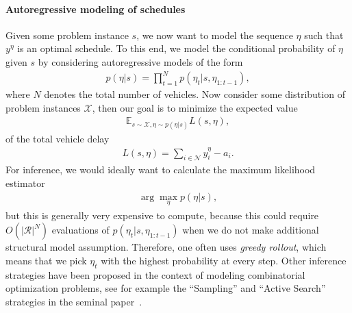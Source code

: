 \documentclass[a4paper]{article}
\theoremstyle{definition}
\theoremstyle{plain}
\begin{document}
\paragraph{Autoregressive modeling of schedules}
Given some problem instance $s$, we now want to model the sequence $\eta$ such
that $y^{\eta}$ is an optimal schedule. To this end, we model the conditional
probability of $\eta$ given $s$ by considering autoregressive models of the form
\begin{align}
  \label{eq:autoregressive}
  p(\eta | s) = \prod_{t=1}^{N} p(\eta_{t} | s, \eta_{1:t-1}) ,
\end{align}
where $N$ denotes the total number of vehicles. Now consider some distribution
of problem instances $\mathcal{X}$, then our goal is to minimize the expected
value
\begin{align*}
  \mathbb{E}_{s \sim \mathcal{X}, \eta \sim p(\eta | s)} L(s, \eta) ,
\end{align*}
of the total vehicle delay
\begin{align*}
  L(s, \eta) = \sum_{i \in \mathcal{N}} y^{\eta}_{i} - a_{i} .
\end{align*}
%
For inference, we would ideally want to calculate the maximum likelihood
estimator
\begin{align*}
  \arg\max_{\eta} p(\eta | s) ,
\end{align*}
but this is generally very expensive to compute, because this could require
$O(|\mathcal{R}|^{N})$ evaluations of $p(\eta_{t} | s, \eta_{1:t-1})$ when we do
not make additional structural model assumption. Therefore, one often uses
\textit{greedy rollout}, which means that we pick $\eta_{t}$ with the highest
probability at every step.
Other inference strategies have been proposed in the context of modeling
combinatorial optimization problems, see for example the ``Sampling'' and
``Active Search'' strategies in the seminal
paper~\cite{belloNeuralCombinatorialOptimization2017}.
\end{document}
